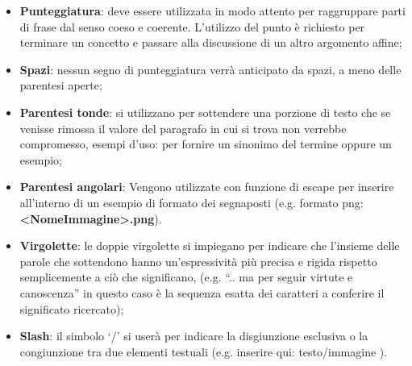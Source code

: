 				\begin{itemize}
					\item\textbf{Punteggiatura}: deve essere utilizzata in modo attento per raggruppare parti di frase dal senso coeso e coerente. L’utilizzo del punto è richiesto per terminare un concetto e passare alla discussione di un altro argomento affine;
					\item\textbf{Spazi}: nessun segno di punteggiatura verrà anticipato da spazi, a meno delle parentesi aperte;
					\item\textbf{Parentesi tonde}: si utilizzano per sottendere una porzione di testo che se venisse rimossa il valore del paragrafo in cui si trova non verrebbe compromesso, esempi d’uso: per fornire un sinonimo del termine oppure un esempio;
					\item\textbf{Parentesi angolari}: Vengono utilizzate con funzione di escape per inserire all’interno di un esempio di formato dei segnaposti (e.g. formato png: \textbf{<NomeImmagine>.png}).
					\item\textbf{Virgolette}: le doppie virgolette si impiegano per indicare che l’insieme delle parole che sottendono hanno un’espressività più precisa e rigida rispetto semplicemente a ciò che significano, (e.g. “.. ma per seguir virtute e canoscenza” in questo caso è la sequenza esatta dei caratteri a conferire il significato ricercato);
					\item\textbf{Slash}: il simbolo ‘/’ si userà per indicare la disgiunzione esclusiva o la congiunzione tra due elementi testuali (e.g. inserire qui: testo/immagine ).
				\end{itemize}
